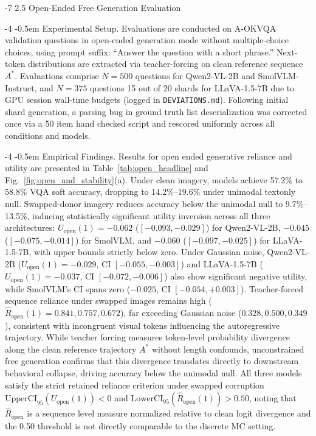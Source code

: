 \documentclass[graybox]{svmult}
\makeatletter
\renewcommand\paragraph{\@startsection{paragraph}{4}{\z@}%
  {-4\p@ \@plus -1\p@ \@minus -1\p@}%
  {-0.5em}%
  {\normalfont\normalsize\bfseries}}
\renewcommand\subsection{\@startsection{subsection}{2}{\z@}%
  {-7\p@ \@plus -2\p@ \@minus -1\p@}%
  {2.5\p@ \@plus 1\p@ \@minus 1\p@}%
  {\normalfont\normalsize\bfseries\boldmath}}
\makeatother
\begin{document}
\subsection{Open-Ended Free Generation Evaluation}
\label{sec:extension_open}

\paragraph{Experimental Setup.}
Evaluations are conducted on A-OKVQA validation questions in open-ended generation mode without multiple-choice choices, using prompt suffix: ``Answer the question with a short phrase.'' Next-token distributions are extracted via teacher-forcing on clean reference sequence $A^*$. Evaluations comprise $N = 500$ questions for Qwen2-VL-2B and SmolVLM-Instruct, and $N = 375$ questions 15 out of 20 shards for LLaVA-1.5-7B due to GPU session wall-time budgets (logged in \texttt{DEVIATIONS.md}). Following initial shard generation, a parsing bug in ground truth list deserialization was corrected once via a 50 item hand checked script and rescored uniformly across all conditions and models.

\paragraph{Empirical Findings.}
Results for open ended generative reliance and utility are presented in Table~\ref{tab:open_headline} and Fig.~\ref{fig:open_and_stability}(a). Under clean imagery, models achieve 57.2\% to 58.8\% VQA soft accuracy, dropping to 14.2\%–19.6\% under unimodal textonly null. Swapped-donor imagery reduces accuracy below the unimodal null to 9.7\%–13.5\%, inducing statistically significant utility inversion across all three architectures: $U_{\text{open}}(1) = -0.062$ ($[-0.093,-0.029]$) for Qwen2-VL-2B, $-0.045$ ($[-0.075,-0.014]$) for SmolVLM, and $-0.060$ ($[-0.097,-0.025]$) for LLaVA-1.5-7B, with upper bounds strictly below zero. Under Gaussian noise, Qwen2-VL-2B ($U_{\text{open}}(1) = -0.029$, CI $[-0.055,-0.003]$) and LLaVA-1.5-7B ($U_{\text{open}}(1) = -0.037$, CI $[-0.072,-0.006]$) also show significant negative utility, while SmolVLM's CI spans zero ($-0.025$, CI $[-0.054,+0.003]$). Teacher-forced sequence reliance under swapped images remains high ($\hat{R}_{\text{open}}(1) = 0.841, 0.757, 0.672$), far exceeding Gaussian noise ($0.328, 0.500, 0.349$), consistent with incongruent visual tokens influencing the autoregressive trajectory. While teacher forcing measures token-level probability divergence along the clean reference trajectory $A^*$ without length confounds, unconstrained free generation confirms that this divergence translates directly to downstream behavioral collapse, driving accuracy below the unimodal null. All three models satisfy the strict retained reliance criterion under swapped corruption $\text{UpperCI}_{95}(U_{\text{open}}(1)) < 0$ and $\text{LowerCI}_{95}(\hat{R}_{\text{open}}(1)) > 0.50$, noting that $\hat{R}_{\text{open}}$ is a sequence level measure normalized relative to clean logit divergence and the 0.50 threshold is not directly comparable to the discrete MC setting.
\end{document}
